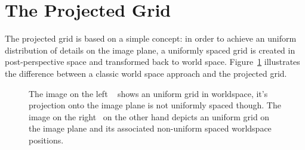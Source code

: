 \section{The Projected Grid}
The projected grid is based on a simple concept: in order to achieve an
uniform distribution of details on the image plane, a uniformly spaced grid is
created in post-perspective space and transformed back to world space.
Figure~\ref{fig:projectedgrid} illustrates the difference between a classic
world space approach and the projected grid.
\begin{figure}[h]
\centering
{}
\caption[The Projected Grid Concept]{The image on the left
~ shows an uniform grid in worldspace, it's
projection onto the image plane is not uniformly spaced though. The image on the
right~ on the other hand depicts an uniform grid on
the image plane and its associated non-uniform spaced worldspace positions.}
\label{fig:projectedgrid}
\end{figure}


